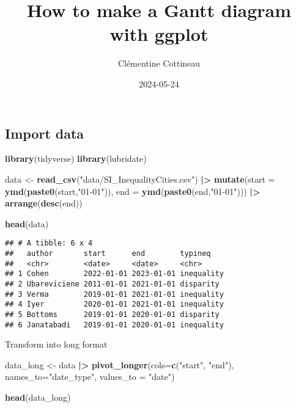 \documentclass[
]{article}
\title{How to make a Gantt diagram with ggplot}
\author{Clémentine Cottineau}
\date{2024-05-24}
\newenvironment{Shaded}{\begin{snugshade}}{\end{snugshade}}
\newcommand{\AttributeTok}[1]{\textcolor[rgb]{0.13,0.29,0.53}{#1}}
\newcommand{\FunctionTok}[1]{\textcolor[rgb]{0.13,0.29,0.53}{\textbf{#1}}}
\newcommand{\NormalTok}[1]{#1}
\newcommand{\OtherTok}[1]{\textcolor[rgb]{0.56,0.35,0.01}{#1}}
\newcommand{\SpecialCharTok}[1]{\textcolor[rgb]{0.81,0.36,0.00}{\textbf{#1}}}
\newcommand{\StringTok}[1]{\textcolor[rgb]{0.31,0.60,0.02}{#1}}
\begin{document}
\maketitle

\hypertarget{import-data}{%
\subsection{Import data}\label{import-data}}

\begin{Shaded}
\begin{Highlighting}[]
\FunctionTok{library}\NormalTok{(tidyverse)}
\FunctionTok{library}\NormalTok{(lubridate)}

\NormalTok{data }\OtherTok{\textless{}{-}} \FunctionTok{read\_csv}\NormalTok{(}\StringTok{"data/SI\_InequalityCities.csv"}\NormalTok{) }\SpecialCharTok{|\textgreater{}}
  \FunctionTok{mutate}\NormalTok{(}\AttributeTok{start =} \FunctionTok{ymd}\NormalTok{(}\FunctionTok{paste0}\NormalTok{(start,}\StringTok{"01{-}01"}\NormalTok{)), }
         \AttributeTok{end =} \FunctionTok{ymd}\NormalTok{(}\FunctionTok{paste0}\NormalTok{(end,}\StringTok{"01{-}01"}\NormalTok{))) }\SpecialCharTok{|\textgreater{}}
  \FunctionTok{arrange}\NormalTok{(}\FunctionTok{desc}\NormalTok{(end)) }

\FunctionTok{head}\NormalTok{(data)}
\end{Highlighting}
\end{Shaded}

\begin{verbatim}
## # A tibble: 6 x 4
##   author       start      end        typineq   
##   <chr>        <date>     <date>     <chr>     
## 1 Cohen        2022-01-01 2023-01-01 inequality
## 2 Ubareviciene 2011-01-01 2021-01-01 disparity 
## 3 Verma        2019-01-01 2021-01-01 inequality
## 4 Iyer         2020-01-01 2021-01-01 inequality
## 5 Bottoms      2019-01-01 2020-01-01 disparity 
## 6 Janatabadi   2019-01-01 2020-01-01 inequality
\end{verbatim}

Transform into long format

\begin{Shaded}
\begin{Highlighting}[]
\NormalTok{data\_long }\OtherTok{\textless{}{-}}\NormalTok{ data }\SpecialCharTok{|\textgreater{}}
  \FunctionTok{pivot\_longer}\NormalTok{(}\AttributeTok{cols=}\FunctionTok{c}\NormalTok{(}\StringTok{"start"}\NormalTok{, }\StringTok{"end"}\NormalTok{),}
            \AttributeTok{names\_to=}\StringTok{"date\_type"}\NormalTok{,}
            \AttributeTok{values\_to =} \StringTok{"date"}\NormalTok{) }

\FunctionTok{head}\NormalTok{(data\_long)}
\end{Highlighting}
\end{Shaded}
\end{document}
